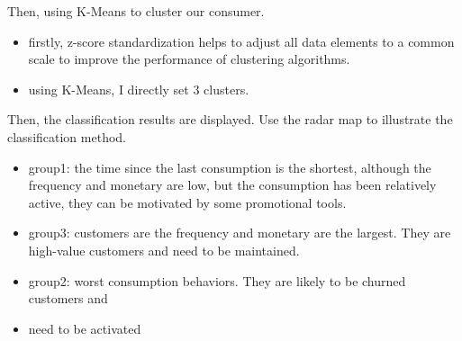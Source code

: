 \documentclass[
  11pt,
]{article}
\newenvironment{Shaded}{\begin{snugshade}}{\end{snugshade}}
\newcommand{\AttributeTok}[1]{\textcolor[rgb]{0.40,0.45,0.13}{#1}}
\newcommand{\CommentTok}[1]{\textcolor[rgb]{0.37,0.37,0.37}{#1}}
\newcommand{\DecValTok}[1]{\textcolor[rgb]{0.68,0.00,0.00}{#1}}
\newcommand{\FunctionTok}[1]{\textcolor[rgb]{0.28,0.35,0.67}{#1}}
\newcommand{\NormalTok}[1]{\textcolor[rgb]{0.00,0.23,0.31}{#1}}
\newcommand{\OtherTok}[1]{\textcolor[rgb]{0.00,0.23,0.31}{#1}}
\newcommand{\SpecialCharTok}[1]{\textcolor[rgb]{0.37,0.37,0.37}{#1}}
\providecommand{\tightlist}{%
  \setlength{\itemsep}{0pt}\setlength{\parskip}{0pt}}\usepackage{longtable,booktabs,array}
\begin{document}
Then, using K-Means to cluster our consumer.

\begin{itemize}
\tightlist
\item
  firstly, z-score standardization helps to adjust all data elements to
  a common scale to improve the performance of clustering algorithms.
\item
  using K-Means, I directly set 3 clusters.
\end{itemize}

\begin{Shaded}
\end{Shaded}

Then, the classification results are displayed. Use the radar map to
illustrate the classification method.

\begin{itemize}
\item
  group1: the time since the last consumption is the shortest, although
  the frequency and monetary are low, but the consumption has been
  relatively active, they can be motivated by some promotional tools.
\item
  group3: customers are the frequency and monetary are the largest. They
  are high-value customers and need to be maintained.
\item
  group2: worst consumption behaviors. They are likely to be churned
  customers and
\item
  need to be activated
\end{itemize}
\end{document}
